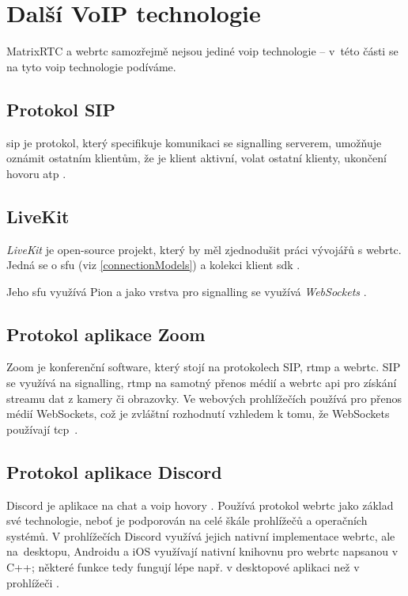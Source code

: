 \section{Další VoIP technologie}\label{voipTech}

MatrixRTC a \gls{webrtc} samozřejmě nejsou jediné \gls{voip} technologie --
v~této části se na tyto \gls{voip} technologie podíváme.

\subsection{Protokol SIP}\label{sip}

\gls{sip} je protokol, který specifikuje komunikaci se signalling serverem,
umožňuje oznámit ostatním klientům, že je klient aktivní, volat ostatní klienty,
ukončení hovoru atp \parencite{ExtraHop-SIPOverview}.

\subsection{LiveKit}

\textit{LiveKit} je open-source projekt, který by měl zjednodušit práci vývojářů
s \gls{webrtc}. Jedná se o \gls{sfu} (viz \ref{connectionModels}) a kolekci
klient \gls{sdk} \parencite{LiveKit-Homepage,GitHub-LiveKit}.

Jeho \gls{sfu} využívá Pion a jako vrstva pro signalling se využívá
\textit{WebSockets} \parencite{GitHub-LiveKit}.

\subsection{Protokol aplikace Zoom}

Zoom je konferenční software, který stojí na protokolech SIP, \gls{rtmp} a
\gls{webrtc}. SIP se využívá na signalling, \gls{rtmp} na samotný přenos médií a
\gls{webrtc} \gls{api} pro získání streamu dat z kamery či obrazovky. Ve
webových prohlížečích používá pro přenos médií WebSockets, což je zvláštní
rozhodnutí vzhledem k tomu, že WebSockets používají
\gls{tcp}~\parencite{WebRTCHacks-HowZoomAvoidWebRTC,EBODigital-HowDoesZoomWork,
    Zoom-Homepage}.

\subsection{Protokol aplikace Discord}

Discord je aplikace na chat a \gls{voip} hovory
\parencite{Discord-WhatIsDiscord}. Používá protokol \gls{webrtc} jako základ své
technologie, neboť je podporován na celé škále prohlížečů a operačních systémů.
V prohlížečích Discord využívá jejich nativní implementace \gls{webrtc}, ale
na~desktopu, Androidu a iOS využívají nativní knihovnu pro \gls{webrtc} napsanou
v C++; některé funkce tedy fungují lépe např. v desktopové aplikaci než v
prohlížeči \parencite{Discord-HowDoesItHandleMillionsOfUsers}.

